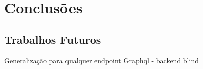 \chapter{Conclusões}
\label{chap6}
 \section{Trabalhos Futuros}
 
Generalização para qualquer endpoint Graphql - backend blind